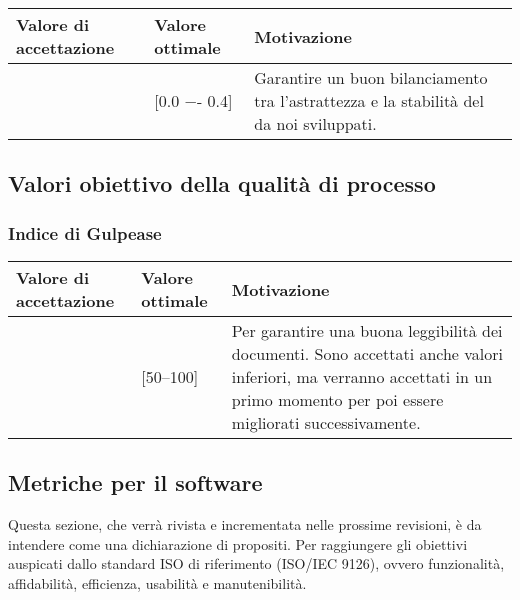 \begin{center}
		\begin{tabular}{|P{2.5cm}|P{2.5cm}|P{6cm}|}
		\hline
			\textbf{Valore di accettazione}	& \textbf{Valore ottimale} & \textbf{Motivazione} \\
			\hline
			[0.0 −- 1] & [0.0 −- 0.4] &	Garantire un buon bilanciamento tra l’astrattezza e la stabilità del  da noi sviluppati.\\
			\hline
			\end{tabular}
\end{center}












\newpage


\subsection{Valori obiettivo della qualità di processo}

\subsubsection{Indice di Gulpease}

\begin{center}

		\begin{tabular}{|P{2.5cm}|P{2.5cm}|P{6cm}|}
		\hline
			\textbf{Valore di accettazione}	& \textbf{Valore ottimale} & \textbf{Motivazione} \\
			\hline
			[40 -- 100] & [50--100] &	Per garantire una buona leggibilità dei documenti. Sono accettati anche valori inferiori, ma verranno accettati in un primo momento per poi essere migliorati successivamente. \\
			\hline
			\end{tabular}
\end{center}

\subsection{Metriche per il software}
Questa sezione, che verrà rivista e incrementata nelle prossime revisioni, è da intendere come una dichiarazione di propositi.
Per raggiungere gli obiettivi auspicati dallo standard ISO di riferimento (ISO/IEC 9126), ovvero funzionalità, affidabilità,
efficienza, usabilità e manutenibilità.


